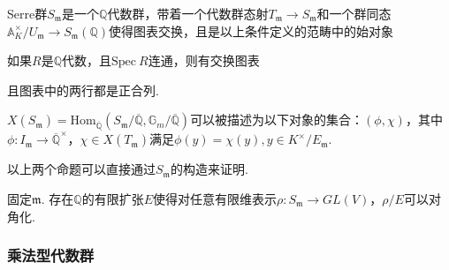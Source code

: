 \begin{cdef}
    Serre群$S_{\mathfrak{m}}$是一个$\mathbb{Q}$代数群，带着一个代数群态射$T_{\mathfrak{m}}\to S_{\mathfrak{m}}$和一个群同态$\mathbb{A}_K^{\times}/U_{\mathfrak{m}}\to S_{\mathfrak{m}}(\mathbb{Q})$使得图表交换，且是以上条件定义的范畴中的始对象
    \begin{figure}[H]
        \centering
    \end{figure}
\end{cdef}

\begin{cprop}
    如果$R$是$\mathbb{Q}$代数，且$\mathrm{Spec}\ R$连通，则有交换图表
    \begin{figure}[H]
        \centering
    \end{figure}
    且图表中的两行都是正合列.
\end{cprop}

\begin{cprop}
    $X(S_{\mathfrak{m}}) = \mathrm{Hom}_{\overline{\mathbb{Q}}}(S_{\mathfrak{m}}/\overline{\mathbb{Q}}, \mathbb{G}_{m}/\overline{\mathbb{Q}})$可以被描述为以下对象的集合：$(\phi, \chi)$，其中$\phi: I_{\mathfrak{m}}\to \overline{\mathbb{Q}}^{\times}$，$\chi\in X(T_{\mathfrak{m}})$满足$\phi(y) = \chi(y), y\in K^{\times}/ E_{\mathfrak{m}}$.
\end{cprop}

以上两个命题可以直接通过$S_{\mathfrak{m}}$的构造来证明.

\begin{cprop}
    固定$\mathfrak{m}$. 存在$\mathbb{Q}$的有限扩张$E$使得对任意有限维表示$\rho:S_{\mathfrak{m}}\to GL(V)$，$\rho/E$可以对角化. \label{reps::split_finite}
\end{cprop}

\subsubsection{乘法型代数群}

